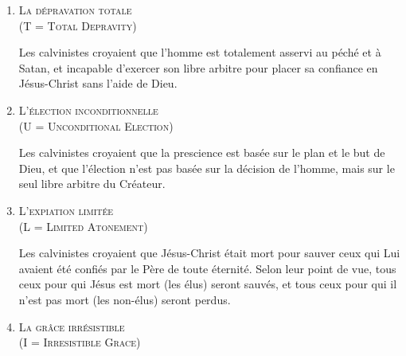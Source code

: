 \begin{enumerate}

  \item  \textsc{La dépravation totale\\\nobreak (\og T \fg{} = Total Depravity)}

\nobreak
\begin{pocketpar}{}
Les calvinistes croyaient que l'hom\-me est totalement 
 asservi au péché  et à Satan,
 et incapable d'exercer son libre arbitre 
 pour placer sa confiance en Jésus-Christ sans l'aide de Dieu.
\end{pocketpar}

  \item  \textsc{L'élection inconditionnelle\\\nobreak (\og U \fg{} = Unconditional Election)}

\nobreak
\begin{pocketpar}{}
\begin{digestpar}{}
Les calvinistes croyaient que la prescience 
 est basée sur le plan et le but de Dieu, et que l'élection
 n'est pas basée sur la décision de l'hom\-me, mais sur le seul \og libre arbitre \fg{}
 du Créateur.
\end{digestpar}
\end{pocketpar}

\pocketpagebreak
  \item  \textsc{L'expiation limitée\\\nobreak (\og L \fg{} = Limited Atonement)}

\nobreak
\begin{digestpar}{}
Les calvinistes croyaient que Jésus-Christ était mort pour sauver
 ceux qui Lui avaient été confiés par le Père de toute éternité.
 Selon leur point de vue, tous ceux pour qui Jésus est mort (les élus) seront sauvés,
 et tous ceux pour qui il n'est pas mort (les non-élus) seront perdus.
\end{digestpar}

  \item  \textsc{La grâce irrésistible\\\nobreak (\og I \fg{} = Irresistible Grace)}


\end{enumerate}
